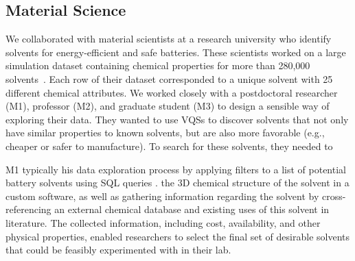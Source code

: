  \subsection{Material Science}
 \par{} 
 \npar We collaborated with material scientists at a research university who identify solvents for energy-efficient and safe batteries. These scientists worked on a large simulation dataset containing chemical properties for more than 280,000 solvents~\cite{Khetan2018}. Each row of their dataset corresponded to a unique solvent with 25 different chemical attributes. We worked closely with a postdoctoral researcher (M1), professor (M2), and graduate student (M3) to design a sensible way of exploring their data. They wanted to use VQSs to discover solvents that not only have similar properties to known solvents, but are also more favorable (e.g., cheaper or safer to manufacture). To search for these solvents, they needed to {\em{}}
 \par{} 
 \npar M1 typically  his data exploration process by applying filters to a list of potential battery solvents using SQL queries .  the 3D chemical structure of the solvent in a custom software, as well as gathering information regarding the solvent by cross-referencing an external chemical database and existing uses of this solvent in literature. The collected information, including cost, availability, and other physical properties, enabled researchers to select the final set of desirable solvents that could be feasibly experimented with in their lab.  %
